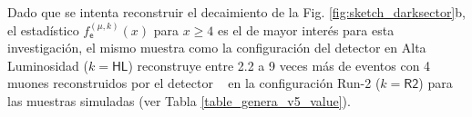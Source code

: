 Dado que se intenta reconstruir el decaimiento de la Fig. \ref{fig:sketch_darksector}b, el estadístico $f^{(\mu, k)}_\textsf{e} (x)$ para $x \geq 4$ es el de mayor interés para esta investigación, el mismo muestra como la configuración del detector en Alta Luminosidad ($k=\textsf{HL}$) reconstruye entre 2.2 a 9 veces más de eventos con 4 muones reconstruidos por el detector \CMS ~ en la configuración Run-2 ($k=\textsf{R2}$) para las muestras simuladas (ver Tabla \ref{table_genera_v5_value}).

